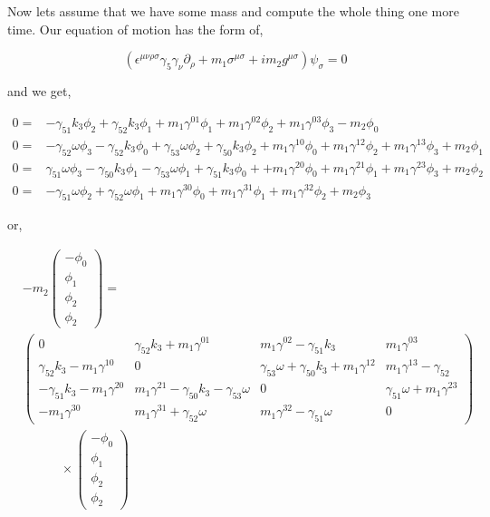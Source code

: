 Now lets assume that we have some mass and compute the whole thing one more time. Our equation of motion has the form of,

\begin{equation}
   \left( \epsilon^{\mu \nu \rho \sigma} \gamma_5 \gamma_\nu \partial_\rho + m_1\sigma^{\mu \sigma} + im_2g^{\mu\sigma} \right)\psi_\sigma = 0
\end{equation}

and we get,

\begin{align}
   0 =& -\gamma_{51}k_3\phi_{2} + \gamma_{52}k_3\phi_{1} + m_1 \gamma^{01}\phi_{1} + m_1 \gamma^{02}\phi_{2} + m_1 \gamma^{03}\phi_{3} - m_2\phi_{0} \nonumber\\
   0 =& -\gamma_{52}\omega\phi_{3} - \gamma_{52}k_3\phi_{0} + \gamma_{53}\omega\phi_{2} + \gamma_{50}k_3\phi_{2} + m_1 \gamma^{10}\phi_{0} + m_1 \gamma^{12}\phi_{2} + m_1 \gamma^{13}\phi_{3} + m_2\phi_{1} \nonumber\\
   0 =& \gamma_{51}\omega\phi_{3} - \gamma_{50}k_3\phi_{1} - \gamma_{53}\omega\phi_{1} + \gamma_{51}k_3\phi_{0} + + m_1 \gamma^{20}\phi_{0} + m_1 \gamma^{21}\phi_{1} + m_1 \gamma^{23}\phi_{3} + m_2\phi_{2} \nonumber\\
   0 =& -\gamma_{51}\omega\phi_{2} + \gamma_{52}\omega\phi_{1} + m_1 \gamma^{30}\phi_{0} + m_1 \gamma^{31}\phi_{1} + m_1 \gamma^{32}\phi_{2} + m_2\phi_{3}
\end{align}

or,

\begin{align}
   &-m_2\begin{pmatrix} -\phi_0 \\ \phi_1 \\  \phi_2 \\ \phi_2 \end{pmatrix} = \\
   &\begin{pmatrix} 0 & \gamma_{52}k_3+m_1\gamma^{01} & m_1\gamma^{02}-\gamma_{51}k_3 &  m_1\gamma^{03} \\    
    \gamma_{52}k_3-m_1\gamma^{10} & 0 & \gamma_{53}\omega+\gamma_{50}k_3+m_1\gamma^{12} & m_1\gamma^{13}-\gamma_{52} \\
    -\gamma_{51}k_3-m_1 \gamma^{20} & m_1\gamma^{21}-\gamma_{50}k_3-\gamma_{53}\omega & 0 & \gamma_{51}\omega+m_1\gamma^{23}\\
    -m_1\gamma^{30} & m_1\gamma^{31}+\gamma_{52}\omega & m_1\gamma^{32}-\gamma_{51}\omega & 0 \end{pmatrix} \nonumber\\
    &\quad \qquad \times \begin{pmatrix} -\phi_0 \\ \phi_1 \\  \phi_2 \\ \phi_2 \end{pmatrix} \nonumber
\end{align}


